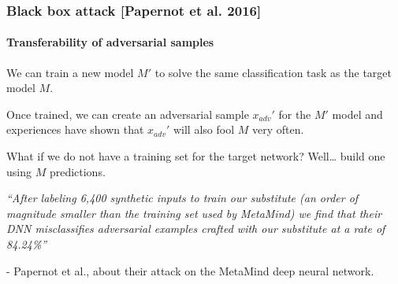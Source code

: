 \documentclass[9pt]{beamer}
\begin{document}
\begin{frame}
  \frametitle{Black box attack [Papernot et al. 2016]}

  \framesubtitle{Transferability of adversarial samples}


  We can train a new model $M'$ to solve the same classification task
  as the target model $M$.

  \pause

  \bigskip

  Once trained, we can create an adversarial sample $x_{adv}'$ for the
  $M'$ model and experiences have shown that $x_{adv}'$ will also fool
  $M$ very often.

  \pause

  \bigskip

  What if we do not have a training set for the target network?
  Well\dots{} build one using $M$ predictions.

  \pause

  \bigskip

  \textit{``After labeling 6,400 synthetic inputs to train our
    substitute (an order of magnitude smaller than the training set
    used by MetaMind) we find that their DNN misclassifies adversarial
    examples crafted with our substitute at a rate of 84.24\%''}

  \smallskip

  - Papernot et al., about their attack on the MetaMind deep neural
  network.

\end{frame}
\end{document}
